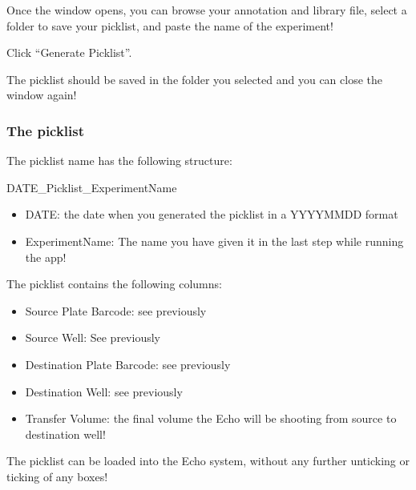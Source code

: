 \documentclass[
]{article}
\providecommand{\tightlist}{%
  \setlength{\itemsep}{0pt}\setlength{\parskip}{0pt}}
\begin{document}
Once the window opens, you can browse your annotation and library file,
select a folder to save your picklist, and paste the name of the
experiment!

Click ``Generate Picklist''.

The picklist should be saved in the folder you selected and you can
close the window again!

\hypertarget{the-picklist}{%
\subsubsection{The picklist}\label{the-picklist}}

The picklist name has the following structure:

DATE\_Picklist\_ExperimentName

\begin{itemize}
\tightlist
\item
  DATE: the date when you generated the picklist in a YYYYMMDD format\\
\item
  ExperimentName: The name you have given it in the last step while
  running the app!
\end{itemize}

The picklist contains the following columns:

\begin{itemize}
\tightlist
\item
  Source Plate Barcode: see previously\\
\item
  Source Well: See previously\\
\item
  Destination Plate Barcode: see previously\\
\item
  Destination Well: see previously\\
\item
  Transfer Volume: the final volume the Echo will be shooting from
  source to destination well!
\end{itemize}

The picklist can be loaded into the Echo system, without any further
unticking or ticking of any boxes!
\end{document}

